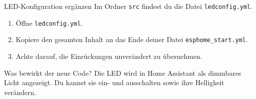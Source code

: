 \documentclass[11pt,aspectratio=169]{beamer}
\begin{document}
\begin{frame}{LED-Konfiguration ergänzen}
  Im Ordner \texttt{src} findest du die Datei
  \texttt{ledconfig.yml}.

  \vspace{1em}

  \begin{enumerate}
    \item Öffne \texttt{ledconfig.yml}.
    \item Kopiere den gesamten Inhalt an das Ende deiner Datei
      \texttt{esphome\_start.yml}.
    \item Achte darauf, die Einrückungen unverändert zu übernehmen.
  \end{enumerate}

  \vspace{0.8em}

  \begin{block}{Was bewirkt der neue Code?}
    Die LED wird in Home Assistant als dimmbares Licht angezeigt. Du kannst
    sie ein- und ausschalten sowie ihre Helligkeit verändern.
  \end{block}
\end{frame}
\end{document}
